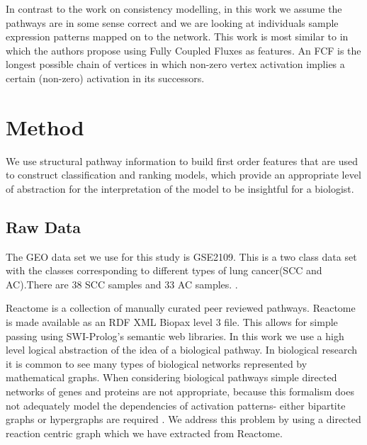 \documentclass[runningheads,a4paper]{llncs}
\begin{document}
In contrast to the work on consistency modelling, in this work we assume the pathways are in some sense correct and we are looking at individuals sample expression patterns mapped on to the network. This work is most similar to  \citep{holec2008using} in which the authors propose using Fully Coupled Fluxes as features. An FCF is the longest possible chain of vertices in which non-zero vertex activation implies a certain (non-zero) activation in its successors.


	  
\section{Method}
We use structural pathway information to build first order features that are used to construct classification and ranking models, which  provide an appropriate level of abstraction for the interpretation of the model to be insightful for a biologist. 
\subsection{Raw Data}
The GEO data set we use for this study is GSE2109. This is a two class data set with the classes corresponding to different types of lung cancer(SCC and AC).There are 38 SCC samples and 33 AC samples. .
	
Reactome \citep{croft_reactome_2013} is a collection of manually curated peer reviewed pathways. Reactome is made available as an RDF XML Biopax level 3 file. This allows for simple passing using SWI-Prolog's semantic web libraries. 
In this work we use a high level logical abstraction of the idea of a biological pathway. In biological research it is common to see many types of biological networks represented by mathematical graphs. When considering biological pathways simple directed networks of genes and proteins are not appropriate, because this formalism does not adequately model the dependencies of activation patterns- either bipartite graphs or hypergraphs are required \citep{whelan2011representation}. We address this problem by using a directed reaction centric graph which we have extracted from Reactome.
\end{document}
